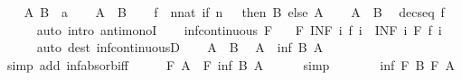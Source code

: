 \begin{isabellebody}
\isadelimproof
%
\endisadelimproof
%
\isatagproof
{}\isamarkupfalse%
\isanewline
\ \ \isamarkupfalse%
\ A\ B\ {\isacharcolon}{\isacharcolon}\ {\isachardoublequoteopen}{\isacharprime}a{\isachardoublequoteclose}\isanewline
\ \ \isamarkupfalse%
\ {\isachardoublequoteopen}A\ {\isasymle}\ B{\isachardoublequoteclose}\isanewline
\ \ \isamarkupfalse%
\ {\isacharquery}f\ {\isacharequal}\ {\isachardoublequoteopen}{\isasymlambda}n{\isacharcolon}{\isacharcolon}nat{\isachardot}\ if\ n\ {\isacharequal}\ {}\ then\ B\ else\ A{\isachardoublequoteclose}\isanewline
\ \ \isamarkupfalse%
\ {\isacartoucheopen}A\ {\isasymle}\ B{\isacartoucheclose}\ \isamarkupfalse%
\ {\isachardoublequoteopen}decseq\ {\isacharquery}f{\isachardoublequoteclose}\isanewline
\ \ \ \ \isamarkupfalse%
\ {\isacharparenleft}auto\ intro{\isacharcolon}\ antimonoI{\isacharparenright}\isanewline
\ \ \isamarkupfalse%
\ {\isacartoucheopen}inf{\isacharunderscore}continuous\ F{\isacartoucheclose}\ \isamarkupfalse%
\ {\isacharasterisk}{\isacharcolon}\ {\isachardoublequoteopen}F\ {\isacharparenleft}INF\ i{\isachardot}\ {\isacharquery}f\ i{\isacharparenright}\ {\isacharequal}\ {\isacharparenleft}INF\ i{\isachardot}\ F\ {\isacharparenleft}{\isacharquery}f\ i{\isacharparenright}{\isacharparenright}{\isachardoublequoteclose}\isanewline
\ \ \ \ \isamarkupfalse%
\ {\isacharparenleft}auto\ dest{\isacharcolon}\ inf{\isacharunderscore}continuousD{\isacharparenright}\isanewline
\ \ \isamarkupfalse%
\ {\isacartoucheopen}A\ {\isasymle}\ B{\isacartoucheclose}\ \isamarkupfalse%
\ {\isachardoublequoteopen}A\ {\isacharequal}\ inf\ B\ A{\isachardoublequoteclose}\isanewline
\ \ \ \ \isamarkupfalse%
\ {\isacharparenleft}simp\ add{\isacharcolon}\ inf{\isachardot}absorb{\isacharunderscore}iff{}{\isacharparenright}\isanewline
\ \ \isamarkupfalse%
\ \isamarkupfalse%
\ {\isachardoublequoteopen}F\ A\ {\isacharequal}\ F\ {\isacharparenleft}inf\ B\ A{\isacharparenright}{\isachardoublequoteclose}\isanewline
\ \ \ \ \isamarkupfalse%
\ simp\isanewline
\ \ \isamarkupfalse%
\ \isamarkupfalse%
\ {\isachardoublequoteopen}{\isasymdots}\ {\isacharequal}\ inf\ {\isacharparenleft}F\ B{\isacharparenright}\ {\isacharparenleft}F\ A{\isacharparenright}{\isachardoublequoteclose}\isanewline
\ \ \ \ \isamarkupfalse%
\ {\isacharasterisk}\ \isamarkupfalse%

\end{isabellebody}
